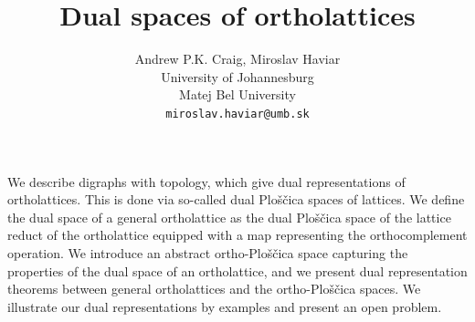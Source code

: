 \documentclass[a4paper]{article} %
\date{} %
\begin{document}
\setcounter{page}{1} %

\title{Dual spaces of ortholattices}

\author{Andrew P.K. Craig, Miroslav Haviar \\ %
       University of Johannesburg\\Matej Bel University \\ %
       \texttt{miroslav.haviar@umb.sk} %
       }%

\maketitle


We describe digraphs with topology, which give dual representations of ortholattices. This is done via so-called dual Plo\v{s}\v{c}ica spaces of lattices. We define the dual space of a general ortholattice as the dual Plo\v{s}\v{c}ica space of the lattice reduct of the ortholattice equipped with a map representing the orthocomplement operation. We introduce an abstract ortho-Plo\v{s}\v{c}ica space capturing the properties of the dual space of an ortholattice, and we present dual representation theorems between general ortholattices and the ortho-Plo\v{s}\v{c}ica spaces. We illustrate our dual representations by examples and present an open problem.


\end{document}

